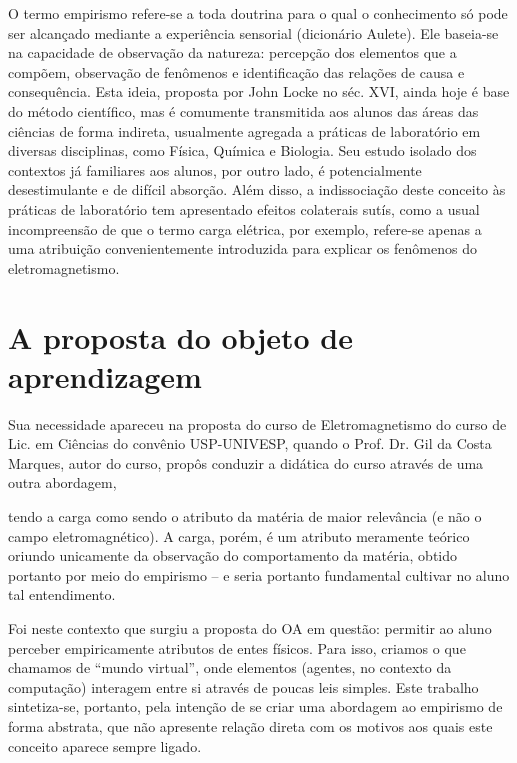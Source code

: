 \documentclass{article}
\begin{document}
O termo empirismo refere-se a toda doutrina para o qual o conhecimento só pode
ser alcançado mediante a experiência sensorial (dicionário Aulete). Ele baseia-se
na capacidade de observação da natureza: percepção dos elementos que a compõem,
observação de fenômenos e identificação das relações de causa e consequência. Esta
ideia, proposta por John Locke no séc. XVI, ainda hoje é base do método científico,
mas é comumente transmitida aos alunos das áreas das ciências de forma indireta,
usualmente agregada a práticas de laboratório em diversas disciplinas, como Física,
Química e Biologia. Seu estudo isolado dos contextos já familiares aos alunos, por outro
lado, é potencialmente desestimulante e de difícil absorção. Além disso, a indissociação
deste conceito às práticas de laboratório tem apresentado efeitos colaterais sutís,
como a usual incompreensão de que o termo carga elétrica, por exemplo, refere-se
apenas a uma atribuição convenientemente introduzida para explicar os fenômenos do
eletromagnetismo.

\section{A proposta do objeto de aprendizagem}

Sua necessidade apareceu na proposta do curso de Eletromagnetismo do curso de Lic.
em Ciências do convênio USP-UNIVESP, quando o Prof. Dr. Gil da Costa Marques,
autor do curso, propôs conduzir a didática do curso através de uma outra abordagem,

tendo a carga como sendo o atributo da matéria de maior relevância (e não o campo
eletromagnético). A carga, porém, é um atributo meramente teórico oriundo unicamente
da observação do comportamento da matéria, obtido portanto por meio do empirismo –
e seria portanto fundamental cultivar no aluno tal entendimento.

Foi neste contexto que surgiu a proposta do OA em questão: permitir ao aluno
perceber empiricamente atributos de entes físicos. Para isso, criamos o que chamamos
de “mundo virtual”, onde elementos (agentes, no contexto da computação) interagem
entre si através de poucas leis simples. Este trabalho sintetiza-se, portanto, pela intenção
de se criar uma abordagem ao empirismo de forma abstrata, que não apresente relação
direta com os motivos aos quais este conceito aparece sempre ligado.
\end{document}
